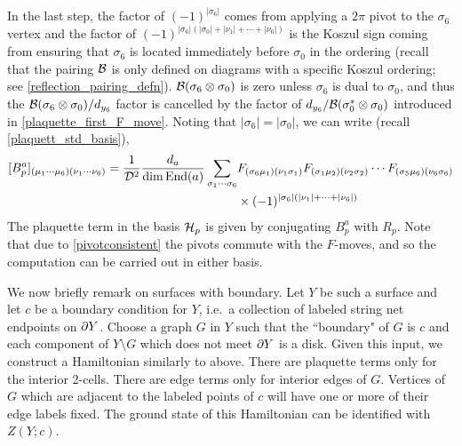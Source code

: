 In the last step, the factor of $(-1)^{|\sigma_6|}$ comes from applying a $2\pi$ pivot 
to the $\sigma_6$ vertex and the factor of $(-1)^{|\sigma_6| ( |\sigma_0|+|\nu_1| + \cdots+ |\nu_6|)}$
is the Koszul sign coming from ensuring that $\sigma_6$ is located immediately before $\sigma_0$ in the ordering (recall that the pairing $\mathcal{B}$ is only defined on diagrams with a specific Koszul ordering; see \eqref{reflection_pairing_defn}). 
$\mathcal{B}(\sigma_6 \otimes \sigma_0)$ is zero unless $\sigma_6$ is dual to $\sigma_0$,
and thus the $\mathcal{B}(\sigma_6\otimes \sigma_0)/d_{y_6}$ factor is cancelled by the factor of $d_{y_6}/\mathcal{B}(\sigma_0^*\otimes\sigma_0)$ introduced in \eqref{plaquette_first_F_move}.
Noting that $|\sigma_6| = |\sigma_0|$, we can write (recall \eqref{plaquett_std_basis}),
\begin{align}
\nonumber
[B_p^a]_{(\mu_1 \cdots \mu_6)(\nu_1 \cdots \nu_6)} =  \frac{1}{\mathcal{D}^2} \frac{d_a}{\dim \text{End}(a)} \sum_{\sigma_1 \cdots \sigma_6} &F_{(\sigma_6 \mu_1)( \nu_1\sigma_1)} 
F_{(\sigma_1 \mu_2)( \nu_2 \sigma_2)} \cdots 
F_{(\sigma_5 \mu_6)( \nu_6 \sigma_6)} 
\\
& \times (-1)^{|\sigma_6| (|\nu_1| + \cdots+ |\nu_6|)}
\label{plaquettematrix}
\end{align} 
The plaquette term in the basis $\mathcal{H}_p$ is given by conjugating $B_p^a$ with $R_p$.
Note that due to \eqref{pivotconsistent} the pivots commute with the $F$-moves, 
and so the computation can be carried out in either basis. 


\medskip

We now briefly remark on surfaces with boundary.
Let $Y$ be such a surface and let $c$ be a boundary condition for $Y$, i.e.\ a collection of labeled string net endpoints on $\partial Y$.
Choose a graph $G$ in $Y$ such that the ``boundary" of $G$ is $c$ and each component of $Y\setminus G$ which does not meet $\partial Y$ is a disk.
Given this input, we construct a Hamiltonian similarly to above.
There are plaquette terms only for the interior 2-cells.
There are edge terms only for interior edges of $G$.
Vertices of $G$ which are adjacent to the labeled points of $c$ will have one or more of their edge labels fixed.
The ground state of this Hamiltonian can be identified with $Z(Y;c)$.

